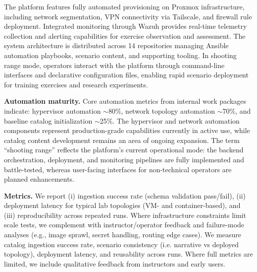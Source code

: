 \documentclass[11pt]{article}
\begin{document}
The platform features fully automated provisioning on Proxmox infrastructure, including network segmentation, VPN connectivity via Tailscale, and firewall rule deployment.
Integrated monitoring through Wazuh provides real-time telemetry collection and alerting capabilities for exercise observation and assessment.
The system architecture is distributed across 14 repositories managing Ansible automation playbooks, scenario content, and supporting tooling.
In shooting range mode, operators interact with the platform through command-line interfaces and declarative configuration files, enabling rapid scenario deployment for training exercises and research experiments.

\textbf{Automation maturity.} 
Core automation metrics from internal work packages indicate: 
hypervisor automation $\sim$80\%, 
network topology automation $\sim$70\%, 
and baseline catalog initialization $\sim$25\%.
The hypervisor and network automation components represent production-grade capabilities currently in active use,
while catalog content development remains an area of ongoing expansion.
The term ``shooting range'' reflects the platform's current operational mode: 
the backend orchestration, deployment, and monitoring pipelines are fully implemented and battle-tested,
whereas user-facing interfaces for non-technical operators are planned enhancements.

\textbf{Metrics.} 
We report (i) ingestion success rate (schema validation pass/fail), 
(ii) deployment latency for typical lab topologies (VM- and container-based), 
and (iii) reproducibility across repeated runs.
Where infrastructure constraints limit scale tests, 
we complement with instructor/operator feedback and failure-mode analyses 
(e.g., image sprawl, secret handling, routing edge cases).
We measure catalog ingestion success rate, 
scenario consistency (i.e. narrative vs deployed topology), 
deployment latency, 
and reusability across runs. 
Where full metrics are limited, 
we include qualitative feedback from instructors and early users.
\end{document}
